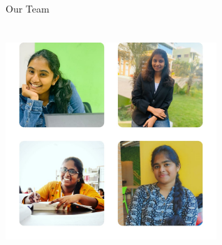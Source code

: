 \documentclass{beamer}
\begin{document}
\begin{frame}{Our Team}
	\begin{columns}
		\begin{column}{0.25cm}
			\begin{center}
				\includegraphics[scale = 0.5,width=8cm,height=8cm]{ourteam1}
				
				{\tiny \textcolor{digiPH_darkorange}{ }}
			\end{center}
		\end{column}
		\begin{column}{5cm}
			\begin{center}
				\Large{}
			
			\end{center}
			
		\end{column}
	\end{columns}
\end{frame}
\end{document}

